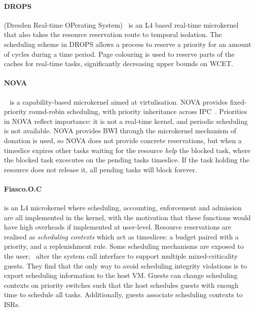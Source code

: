 \paragraph{DROPS} (Dresden Real-time OPerating System)~\citep{Haertig_BBHHMRSW_98} is an L4 based real-time microkernel that also takes the resource reservation route to temporal isolation.
The scheduling scheme in DROPS allows a process to reserve a priority for an amount of cycles during a time period.
Page colouring is used to reserve parts of the caches for real-time tasks, significantly decreasing upper bounds on \gls{WCET}.

\paragraph{NOVA}~\citep{Steinberg_Kauer_10} is a capability-based microkernel aimed at virtulisation. 
NOVA provides fixed-priority round-robin scheduling, with priority inheritance across IPC~\citep{Steinberg_BK_10}.
Priorities in NOVA reflect importance: it is not a real-time kernel, and periodic scheduling is not available.  
NOVA provides \gls{BWI} through the microkernel mechanism of donation is used, so NOVA does not provide concrete reservations, but when a timeslice expires other tasks waiting for the resource \emph{help} the blocked task, where the blocked task excecutes on the pending tasks timeslice.
If the task holding the resource does not release it, all pending tasks will block forever.


\paragraph{Fiasco.O.C} is an L4 microkernel where scheduling, accounting, enforcement and admission are all implemented in the kernel, with the motivation that these functions would have high overheads if implemented at user-level. 
Resource reservations are realised as \emph{scheduling contexts} which act as timeslices: a budget paired with a priority, and a replenishment rule. 
Some scheduling mechanisms are exposed to the user;~\citet{Lackorzynski_WVH_12} alter the system call interface to support multiple mixed-criticality guests.
They find that the only way to avoid scheduling integrity violations is to export scheduling information to the host \gls{VM}.
Guests can change scheduling contexts on priority switches such that the host schedules guests with enough time to schedule all tasks.
Additionally, guests associate scheduling contexts to \glspl{ISR}.

